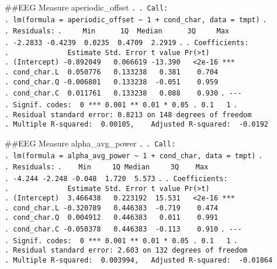 \documentclass[
]{article}
\begin{document}
\#\#EEG Measure aperiodic\_offset \texttt{.} \texttt{.\ Call:}
\texttt{.\ lm(formula\ =\ aperiodic\_offset\ \textasciitilde{}\ 1\ +\ cond\_char,\ data\ =\ tmpt)}
\texttt{.} \texttt{.\ Residuals:}
\texttt{.\ \ \ \ \ Min\ \ \ \ \ \ 1Q\ \ Median\ \ \ \ \ \ 3Q\ \ \ \ \ Max}
\texttt{.\ -2.2833\ -0.4239\ \ 0.0235\ \ 0.4709\ \ 2.2919} \texttt{.}
\texttt{.\ Coefficients:}
\texttt{.\ \ \ \ \ \ \ \ \ \ \ \ \ \ Estimate\ Std.\ Error\ t\ value\ Pr(\textgreater{}\textbar{}t\textbar{})}
\texttt{.\ (Intercept)\ -0.892049\ \ \ 0.066619\ -13.390\ \ \ \textless{}2e-16\ ***}
\texttt{.\ cond\_char.L\ \ 0.050776\ \ \ 0.133238\ \ \ 0.381\ \ \ \ 0.704}
\texttt{.\ cond\_char.Q\ -0.006801\ \ \ 0.133238\ \ -0.051\ \ \ \ 0.959}
\texttt{.\ cond\_char.C\ \ 0.011761\ \ \ 0.133238\ \ \ 0.088\ \ \ \ 0.930}
\texttt{.\ -\/-\/-}
\texttt{.\ Signif.\ codes:\ \ 0\ \textquotesingle{}***\textquotesingle{}\ 0.001\ \textquotesingle{}**\textquotesingle{}\ 0.01\ \textquotesingle{}*\textquotesingle{}\ 0.05\ \textquotesingle{}.\textquotesingle{}\ 0.1\ \textquotesingle{}\ \textquotesingle{}\ 1}
\texttt{.}
\texttt{.\ Residual\ standard\ error:\ 0.8213\ on\ 148\ degrees\ of\ freedom}
\texttt{.\ Multiple\ R-squared:\ \ 0.00105,\ \ \ \ Adjusted\ R-squared:\ \ -0.0192}

\#\#EEG Measure alpha\_avg\_power \texttt{.} \texttt{.\ Call:}
\texttt{.\ lm(formula\ =\ alpha\_avg\_power\ \textasciitilde{}\ 1\ +\ cond\_char,\ data\ =\ tmpt)}
\texttt{.} \texttt{.\ Residuals:}
\texttt{.\ \ \ \ Min\ \ \ \ \ 1Q\ Median\ \ \ \ \ 3Q\ \ \ \ Max}
\texttt{.\ -4.244\ -2.248\ -0.048\ \ 1.720\ \ 5.573} \texttt{.}
\texttt{.\ Coefficients:}
\texttt{.\ \ \ \ \ \ \ \ \ \ \ \ \ \ Estimate\ Std.\ Error\ t\ value\ Pr(\textgreater{}\textbar{}t\textbar{})}
\texttt{.\ (Intercept)\ \ 3.466438\ \ \ 0.223192\ \ 15.531\ \ \ \textless{}2e-16\ ***}
\texttt{.\ cond\_char.L\ -0.320789\ \ \ 0.446383\ \ -0.719\ \ \ \ 0.474}
\texttt{.\ cond\_char.Q\ \ 0.004912\ \ \ 0.446383\ \ \ 0.011\ \ \ \ 0.991}
\texttt{.\ cond\_char.C\ -0.050378\ \ \ 0.446383\ \ -0.113\ \ \ \ 0.910}
\texttt{.\ -\/-\/-}
\texttt{.\ Signif.\ codes:\ \ 0\ \textquotesingle{}***\textquotesingle{}\ 0.001\ \textquotesingle{}**\textquotesingle{}\ 0.01\ \textquotesingle{}*\textquotesingle{}\ 0.05\ \textquotesingle{}.\textquotesingle{}\ 0.1\ \textquotesingle{}\ \textquotesingle{}\ 1}
\texttt{.}
\texttt{.\ Residual\ standard\ error:\ 2.603\ on\ 132\ degrees\ of\ freedom}
\texttt{.\ Multiple\ R-squared:\ \ 0.003994,\ \ \ Adjusted\ R-squared:\ \ -0.01864}
\end{document}
